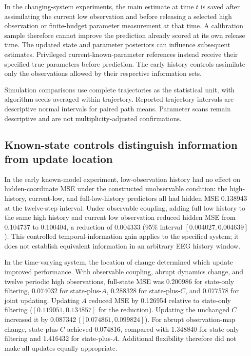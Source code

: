 \documentclass[11pt,a4paper]{article}
\begin{document}
In the changing-system experiments, the main estimate at time $t$ is saved after assimilating the current low observation and before releasing a selected high observation or finite-budget parameter measurement at that time. A calibration sample therefore cannot improve the prediction already scored at its own release time. The updated state and parameter posteriors can influence subsequent estimates. Privileged current-known-parameter references instead receive their specified true parameters before prediction. The early history controls assimilate only the observations allowed by their respective information sets.

Simulation comparisons use complete trajectories as the statistical unit, with algorithm seeds averaged within trajectory. Reported trajectory intervals are descriptive normal intervals for paired path means. Parameter scans remain descriptive and are not multiplicity-adjusted confirmations.

\subsection{Known-state controls distinguish information from update location}
\label{sec:mechanisms}

In the early known-model experiment, low-observation history had no effect on hidden-coordinate MSE under the constructed unobservable condition: the high-history, current-low, and full-low-history predictors all had hidden MSE 0.138943 at the twelve-step interval. Under observable coupling, adding full low history to the same high history and current low observation reduced hidden MSE from 0.104737 to 0.100404, a reduction of 0.004333 (95\% interval $[0.004027,0.004639]$). This controlled temporal-information gain applies to the specified system; it does not establish equivalent information in an arbitrary EEG history window.

In the time-varying system, the location of change determined which update improved performance. With observable coupling, abrupt dynamics change, and twelve periodic high observations, full-state MSE was 0.200986 for state-only filtering, 0.074032 for state-plus-$A$, 0.288328 for state-plus-$C$, and 0.077578 for joint updating. Updating $A$ reduced MSE by 0.126954 relative to state-only filtering ($[0.119051,0.134857]$ for the reduction). Updating the unchanged $C$ increased it by 0.087342 ($[0.074861,0.099824]$). For abrupt observation-map change, state-plus-$C$ achieved 0.074816, compared with 1.348840 for state-only filtering and 1.416432 for state-plus-$A$. Additional flexibility therefore did not make all updates equally appropriate.
\end{document}
